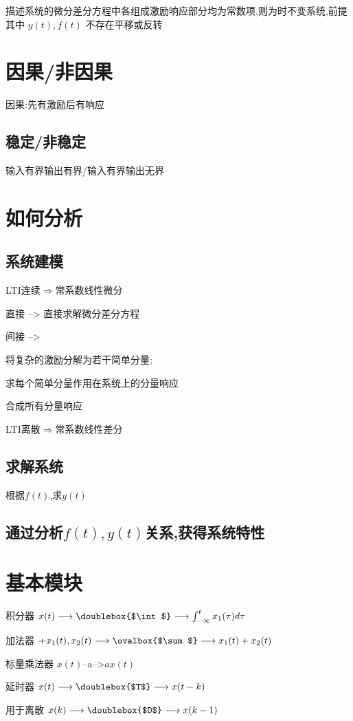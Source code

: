 \documentclass{article}
\begin{document}
    描述系统的微分差分方程中各组成激励响应部分均为常数项,则为时不变系统,前提其中 $y(t),f(t)$ 不存在平移或反转

    \section{因果/非因果}%
    因果:先有激励后有响应
    \subsection{稳定/非稳定}%
    输入有界输出有界/输入有界输出无界

    \section{如何分析}%
    \subsection{系统建模}%
    LTI连续$\Longrightarrow$常系数线性微分

    直接  -->  直接求解微分差分方程

    间接  -->  

    将复杂的激励分解为若干简单分量;

    求每个简单分量作用在系统上的分量响应

    合成所有分量响应

    LTI离散$\Longrightarrow$常系数线性差分
    \subsection{求解系统}%
    根据$f(t)$,求$y(t)$
    \subsection{通过分析$f(t),y(t)$关系,获得系统特性}%

    \section{基本模块}%
    
    积分器
    $x(t)\longrightarrow\doublebox{$\int$}\longrightarrow\int_{-\infty}^{t}x_1(\tau)d\tau$

    加法器
    $+x_1(t),x_2(t)\longrightarrow\ovalbox{$\sum$}\longrightarrow x_1(t)+x_2(t)$

    标量乘法器
    $x(t)$--a-->$ax(t)$

    延时器
    $x(t)\longrightarrow\doublebox{$T$}\longrightarrow x(t-k)$ 

    用于离散
    $x(k)\longrightarrow\doublebox{$D$}\longrightarrow x(k-1)$ 
\end{document}
